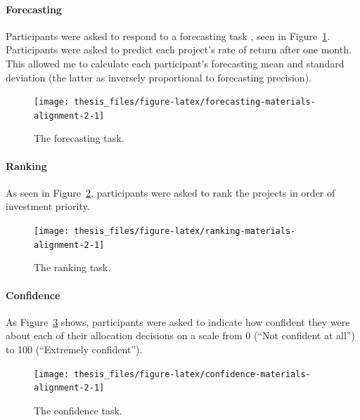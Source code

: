 \documentclass[a4paper, nobind, dvipsnames]{templates/ociamthesis}
\theoremstyle{definition}
\theoremstyle{definition}
\theoremstyle{definition}
\theoremstyle{definition}
\theoremstyle{remark}
\begin{document}
\hypertarget{forecasting-materials-alignment-2}{%
\paragraph{Forecasting}\label{forecasting-materials-alignment-2}}

Participants were asked to respond to a forecasting task \autocite[adapted from][]{long2018}, seen in Figure~\ref{fig:forecasting-materials-alignment-2}.
Participants were asked to predict each project's rate of return after one
month. This allowed me to calculate each participant's forecasting mean and
standard deviation (the latter as inversely proportional to forecasting
precision).



\begin{figure}
\texttt{[image: thesis\_files/figure-latex/forecasting-materials-alignment-2-1]} \caption{The forecasting task.}\label{fig:forecasting-materials-alignment-2}
\end{figure}

\hypertarget{ranking-materials-alignment-2}{%
\paragraph{Ranking}\label{ranking-materials-alignment-2}}

As seen in Figure~\ref{fig:ranking-materials-alignment-2}, participants were
asked to rank the projects in order of investment priority.



\begin{figure}
\texttt{[image: thesis\_files/figure-latex/ranking-materials-alignment-2-1]} \caption{The ranking task.}\label{fig:ranking-materials-alignment-2}
\end{figure}

\hypertarget{confidence-materials-alignment-2}{%
\paragraph{Confidence}\label{confidence-materials-alignment-2}}

As Figure~\ref{fig:confidence-materials-alignment-2} shows, participants were
asked to indicate how confident they were about each of their allocation
decisions on a scale from 0 (``Not confident at all'') to 100 (``Extremely
confident'').



\begin{figure}
\texttt{[image: thesis\_files/figure-latex/confidence-materials-alignment-2-1]} \caption{The confidence task.}\label{fig:confidence-materials-alignment-2}
\end{figure}
\end{document}
